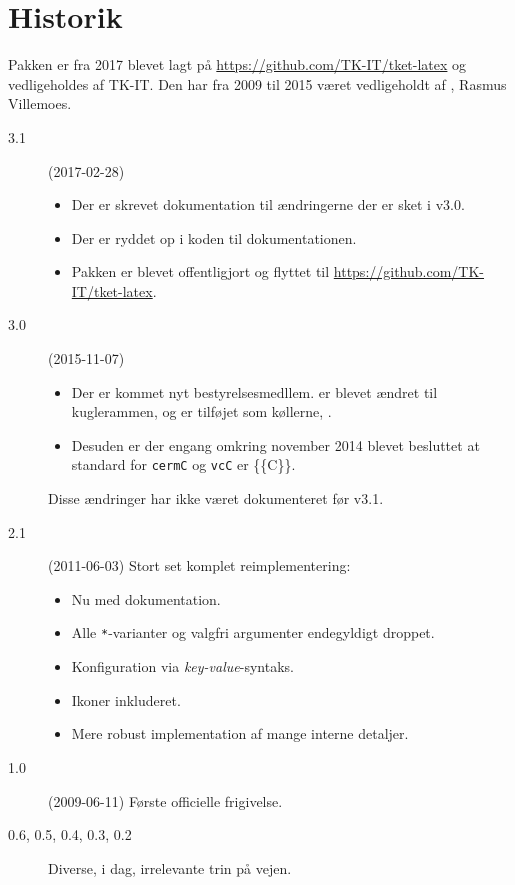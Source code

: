 \documentclass[a4paper,article,oneside,danish]{memoir}
\begin{document}
\section{Historik}
\label{sec:historik}

Pakken er fra 2017 blevet lagt på \url{https://github.com/TK-IT/tket-latex} og
vedligeholdes af TK-IT.
Den har fra 2009 til 2015 været vedligeholdt af \KASS, Rasmus
Villemoes.

\begin{description}
\item[3.1] (2017-02-28)
  \begin{itemize}
  \item Der er skrevet dokumentation til ændringerne der er sket i v3.0.
  \item Der er ryddet op i koden til dokumentationen.
  \item Pakken er blevet offentligjort og flyttet til \url{https://github.com/TK-IT/tket-latex}.
  \end{itemize}
\item[3.0] (2015-11-07)
  \begin{itemize}
  \item Der er kommet nyt bestyrelsesmedllem.  er blevet ændret til
    kuglerammen, \ikonKASS og  er tilføjet som køllerne, \ikonINKA.
  \item Desuden er der engang omkring november 2014 blevet
  besluttet at standard for \texttt{cermC} og \texttt{vcC} er
  \{\{C\}\}.
  \end{itemize}
  Disse ændringer har ikke været dokumenteret før v3.1.
\item[2.1] (2011-06-03) Stort set komplet reimplementering:
  \begin{itemize}
  \item Nu med dokumentation.
  \item Alle \texttt{*}-varianter og valgfri argumenter endegyldigt droppet.
  \item Konfiguration via \textit{key-value}-syntaks.
  \item Ikoner inkluderet.
  \item Mere robust implementation af mange interne detaljer.
  \end{itemize}
\item[1.0] (2009-06-11) Første officielle frigivelse.
\item[0.6, 0.5, 0.4, 0.3, 0.2] Diverse, i dag, irrelevante trin på vejen.

\end{description}
\end{document}
